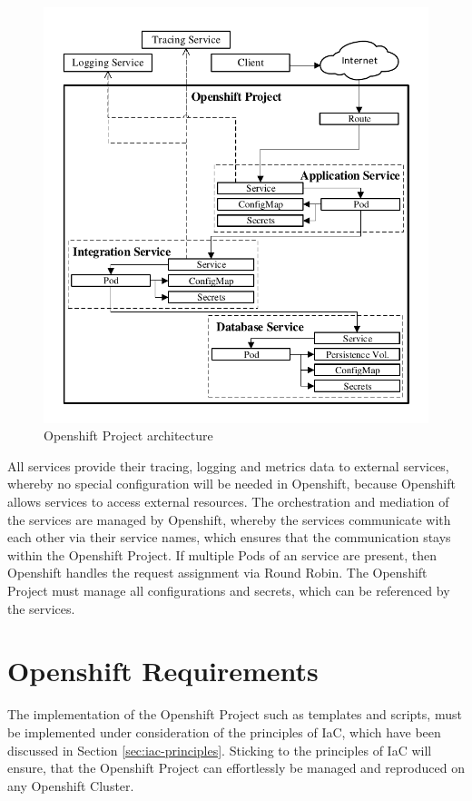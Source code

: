 \begin{figure}[htbp]
	\centering
	\includegraphics[scale=1]{images/esboc-design-openshift.pdf}
	\caption{Openshift Project architecture}
	\label{fig:esboc-design-openshift-project}
\end{figure} 

All services provide their tracing, logging and metrics data to external services, whereby no special configuration will be needed in Openshift, because Openshift allows services to access external resources. The orchestration and mediation of the services are managed by Openshift, whereby the services communicate with each other via their service names, which ensures that the communication stays within the Openshift Project. If multiple Pods of an service are present, then Openshift handles the request assignment via Round Robin. The Openshift Project must manage all configurations and secrets, which can be referenced by the services.

\section{Openshift Requirements}
\label{sec:esboc-requirements-oc}
The implementation of the Openshift Project such as templates and scripts, must be implemented under consideration of the principles of IaC, which have been discussed in Section \vref{sec:iac-principles}. Sticking to the principles of IaC will ensure, that the Openshift Project can effortlessly be managed and reproduced on any Openshift Cluster. \\

